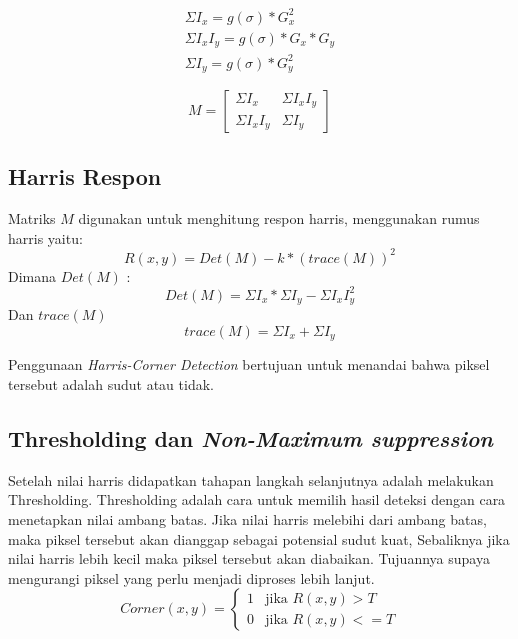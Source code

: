 \begin{equation*}
    \begin{aligned}
        \Sigma I_{x} = g(\sigma) * G_{x}^2 \\
        \Sigma I_{x}I_{y} = g(\sigma) * G_{x} * G_{y} \\
        \Sigma I_{y} = g(\sigma) * G_{y}^2
    \end{aligned}
\end{equation*}

\begin{equation}
    M = 
    \begin{bmatrix}
        \Sigma I_{x} & \Sigma I_{x}I_{y} \\
        \Sigma I_{x}I_{y} & \Sigma I_{y}
    \end{bmatrix} 
\end{equation}

\subsection{Harris Respon}
    Matriks \(M\) digunakan untuk menghitung respon harris, menggunakan rumus harris yaitu:
\begin{equation}
    R(x,y) = Det(M) - k * (trace(M))^2
\end{equation}
Dimana \(Det(M)\) :
\begin{equation*}
    Det(M) = \Sigma I_{x} * \Sigma I_{y} - \Sigma I_{x}I_{y}^2
\end{equation*}
Dan \(trace(M)\) 
\begin{equation*}
    trace(M) = \Sigma I_{x} + \Sigma I_{y}
\end{equation*}

    Penggunaan \emph{Harris-Corner Detection} bertujuan untuk menandai bahwa piksel tersebut adalah sudut atau tidak.


\subsection{Thresholding dan \emph{Non-Maximum suppression}}
    Setelah nilai harris didapatkan tahapan langkah selanjutnya adalah melakukan Thresholding.
Thresholding adalah cara untuk memilih hasil deteksi dengan cara menetapkan nilai ambang batas.
Jika nilai harris melebihi dari ambang batas, maka piksel tersebut akan dianggap sebagai potensial sudut kuat, Sebaliknya jika nilai harris lebih kecil maka piksel tersebut akan diabaikan.
Tujuannya supaya mengurangi piksel yang perlu menjadi diproses lebih lanjut. 
\begin{equation}
    Corner(x,y) = 
    \begin{cases}  
        1 & \text{jika } R(x,y) > T \\ 
        0 & \text{jika } R(x,y) <= T
    \end{cases}
\end{equation}

